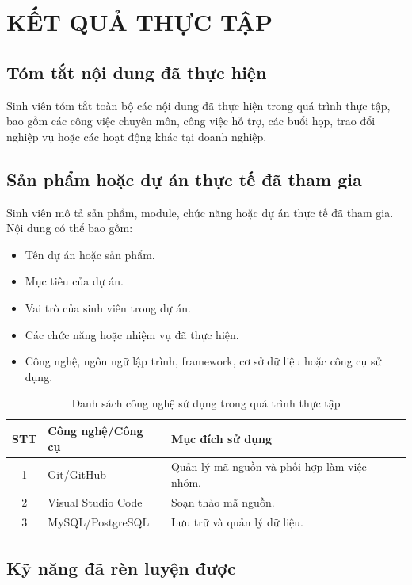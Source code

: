 \chapter{KẾT QUẢ THỰC TẬP}

\section{Tóm tắt nội dung đã thực hiện}

Sinh viên tóm tắt toàn bộ các nội dung đã thực hiện trong quá trình thực tập, bao gồm các công việc chuyên môn, công việc hỗ trợ, các buổi họp, trao đổi nghiệp vụ hoặc các hoạt động khác tại doanh nghiệp.

\section{Sản phẩm hoặc dự án thực tế đã tham gia}

Sinh viên mô tả sản phẩm, module, chức năng hoặc dự án thực tế đã tham gia. Nội dung có thể bao gồm:

\begin{itemize}
    \item Tên dự án hoặc sản phẩm.
    \item Mục tiêu của dự án.
    \item Vai trò của sinh viên trong dự án.
    \item Các chức năng hoặc nhiệm vụ đã thực hiện.
    \item Công nghệ, ngôn ngữ lập trình, framework, cơ sở dữ liệu hoặc công cụ sử dụng.
\end{itemize}

\begin{table}[H]
\centering
\caption{Danh sách công nghệ sử dụng trong quá trình thực tập}
\label{tab:cong-nghe-su-dung}
\begin{tabular}{|c|p{4cm}|p{8cm}|}
\hline
\textbf{STT} & \textbf{Công nghệ/Công cụ} & \textbf{Mục đích sử dụng} \\
\hline
1 & Git/GitHub & Quản lý mã nguồn và phối hợp làm việc nhóm. \\
\hline
2 & Visual Studio Code & Soạn thảo mã nguồn. \\
\hline
3 & MySQL/\allowbreak PostgreSQL & Lưu trữ và quản lý dữ liệu. \\
\hline
\end{tabular}
\end{table}

\section{Kỹ năng đã rèn luyện được}

